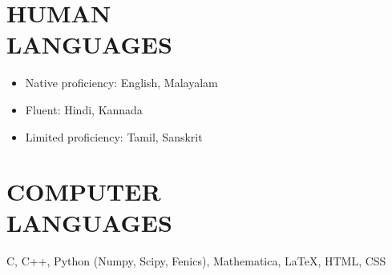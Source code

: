 \documentclass[margin]{res} %
\begin{document}
\begin{resume}
\section{HUMAN \\ LANGUAGES}
\begin{itemize}
	\item Native proficiency: English, Malayalam
	\item Fluent: Hindi, Kannada
	\item Limited proficiency: Tamil, Sanskrit
\end{itemize}

\section{COMPUTER \\ LANGUAGES}
C, C++, Python (Numpy, Scipy, Fenics), Mathematica, \LaTeX, HTML, CSS

\end{resume}
\end{document}
